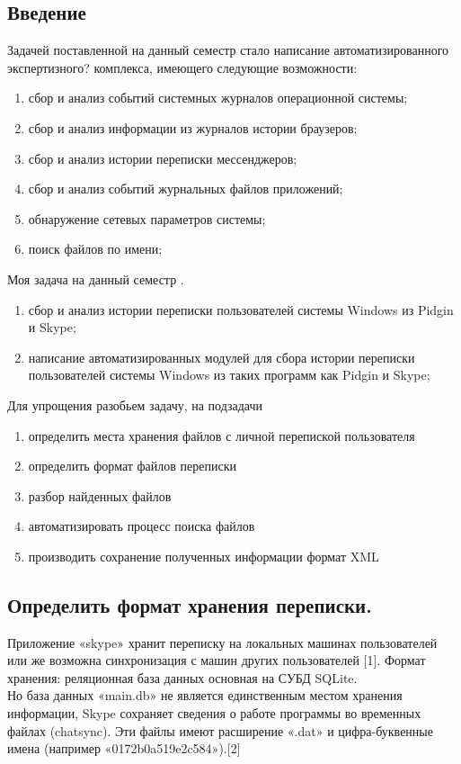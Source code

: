 \newpage

\subsection{Введение}

Задачей поставленной на данный семестр стало написание автоматизированного экспертизного? комплекса, имеющего следующие возможности: 

\begin{enumerate}
\item сбор и анализ событий системных журналов операционной системы;
\item сбор и анализ информации из журналов истории браузеров;
\item сбор и анализ истории переписки мессенджеров;
\item сбор и анализ событий журнальных файлов приложений;
\item обнаружение сетевых параметров системы;
\item поиск файлов по имени;
\end{enumerate}

Моя задача на данный семестр . 

\begin{enumerate}
\item сбор и анализ истории переписки пользователей системы Windows из Pidgin и Skype;
\item написание автоматизированных модулей для сбора истории переписки пользователей системы Windows из таких программ как Pidgin и Skype;
\end{enumerate}

Для упрощения разобьем задачу, на подзадачи
\begin{enumerate}
\item определить места хранения файлов с личной перепиской пользователя
\item определить формат файлов переписки
\item разбор найденных файлов
\item автоматизировать процесс поиска файлов
\item производить сохранение полученных информации формат XML
\end{enumerate}

\subsection{Определить формат хранения переписки.}

Приложение «skype» хранит переписку на локальных машинах пользователей или же возможна синхронизация с машин других пользователей [1]. Формат хранения: реляционная база данных основная на СУБД SQLite.\\ 
Но база данных «main.db» не является единственным местом хранения информации, Skype сохраняет сведения о работе программы во временных файлах (chatsync). Эти файлы имеют расширение «.dat» и цифра-буквенные имена (например «0172b0a519e2c584»).[2]

